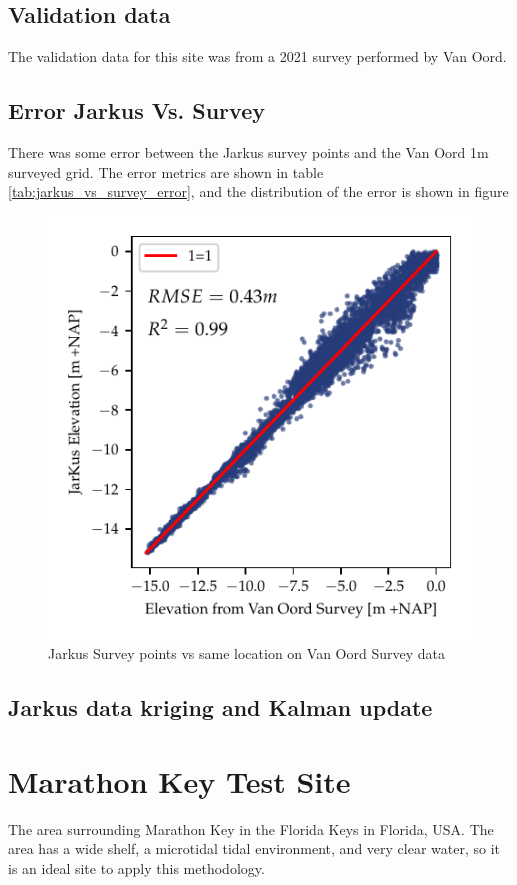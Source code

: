 \subsection{Validation data}
The validation data for this site was from a 2021 survey performed by Van Oord.
\subsection{Error Jarkus Vs. Survey}
There was some error between the Jarkus survey points and the Van Oord 1m surveyed grid. The error metrics are shown in table \ref{tab:jarkus_vs_survey_error}, and the distribution of the error is shown in figure


\begin{figure}[h]
    \centering
    \includegraphics{figures/petten_lidar_estimated_vs_truth.pdf}
    \caption{Jarkus Survey points vs same location on Van Oord Survey data}
    \label{fig:jarkus_vs_survey}
\end{figure}

\subsection{Jarkus data kriging and Kalman update}


\section{Marathon Key Test Site}
The area surrounding Marathon Key in the Florida Keys in Florida, USA. The area has a wide shelf, a microtidal tidal environment, and very clear water, so it is an ideal site to apply this methodology. 

